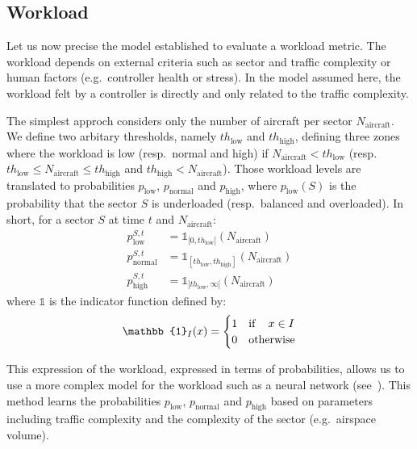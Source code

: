\documentclass[oneside,twocolumn]{article}
\begin{document}
\subsection{Workload}\label{sub:workload}

Let us now precise the model established to evaluate a workload metric. The
workload depends on external criteria such as sector and traffic complexity
or human factors (e.g.\ controller health or stress). In the model assumed here,
the workload felt by a controller is directly and only related to the traffic
complexity.

The simplest approch considers only the number of aircraft per sector $N_\text{aircraft}$. We
define two arbitary thresholds, namely $th_\text{low}$ and $th_\text{high}$, defining
three zones where the workload is low (resp.\ normal and high) if $N_\text{aircraft} < th_\text{low}$
(resp. $th_\text{low} \leq N_\text{aircraft} \leq th_\text{high}$ and $th_\text{high} < N_\text{aircraft}$).
Those workload levels are translated to probabilities $p_\text{low}$, $p_\text{normal}$ and
$p_\text{high}$, where $p_\text{low}(S)$ is the probability that the sector $S$ is underloaded
(resp.\ balanced and overloaded). In short, for a sector $S$ at time $t$ and $N_\text{aircraft}$:
\begin{equation}
  \begin{aligned}
    p_\text{low}^{S, t} &= \mathbb{1}_{[0, th_\text{low}[}(N_\text{aircraft}) \\
    p_\text{normal}^{S, t} &= \mathbb{1}_{[th_\text{low}, th_\text{high}]}(N_\text{aircraft})\\
    p_\text{high}^{S, t} &= \mathbb{1}_{]th_\text{low}, \infty[}(N_\text{aircraft})
  \end{aligned}
\end{equation}
where $\mathbb{1}$ is the indicator function defined by:
\begin{equation}
  \mathbb{1}_{I}(x) =
  \begin{cases}
    1 & \text{if\,} \quad x \in I\\
    0 & \text{otherwise}
  \end{cases}
\end{equation}

This expression of the workload, expressed in terms of probabilities, allows us to
use a more complex model for the workload such as a neural network
(see~\cite{gianazza2010forecasting}). This method learns the probabilities $p_\text{low}$,
$p_\text{normal}$ and $p_\text{high}$ based on parameters including traffic complexity and
the complexity of the sector (e.g.\ airspace volume).
\end{document}
